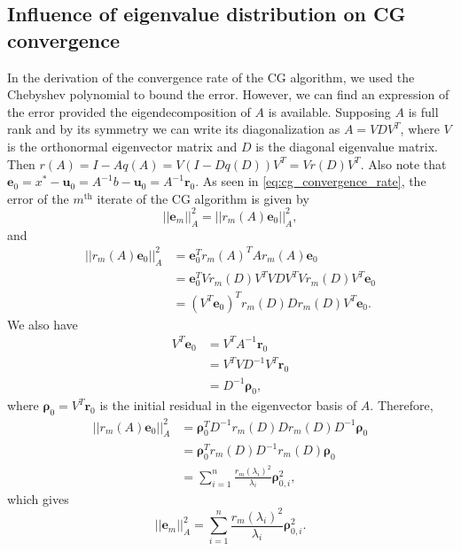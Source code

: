 \subsection{Influence of eigenvalue distribution on CG convergence}\label{sec:cg_eigenvalue_distribution}
In the derivation of the convergence rate of the CG algorithm, we used the Chebyshev polynomial to bound the error. However, we can find an expression of the error provided the eigendecomposition of $A$ is available. Supposing $A$ is full rank and by its symmetry we can write its diagonalization as $A = VDV^T$, where $V$ is the orthonormal eigenvector matrix and $D$ is the diagonal eigenvalue matrix. Then $r(A) = I - Aq(A) = V(I - Dq(D))V^T = Vr(D)V^T$. Also note that $\mathbf{e}_0 = x^* - \mathbf{u}_0 = A^{-1}b - \mathbf{u}_0 = A^{-1}\mathbf{r}_0$. As seen in \cref{eq:cg_convergence_rate}, the error of the $m^{\text{th}}$ iterate of the CG algorithm is given by
\begin{equation*}
  ||\mathbf{e}_m||_A^2 = ||r_m(A)\mathbf{e}_0||_A^2,
\end{equation*}
and
\begin{align*}
  ||r_m(A)\mathbf{e}_0||_A^2 & = \mathbf{e}_0^T r_m(A)^T A r_m(A) \mathbf{e}_0                 \\
                           & = \mathbf{e}_0^T V r_m(D) V^T V D V^T V r_m(D) V^T \mathbf{e}_0 \\
                           & = (V^T\mathbf{e}_0)^T r_m(D) D r_m(D) V^T \mathbf{e}_0.
\end{align*}
We also have
\begin{align*}
  V^T\mathbf{e}_0 & = V^T A^{-1} \mathbf{r}_0       \\
                & = V^T V D^{-1} V^T \mathbf{r}_0 \\
                & = D^{-1} \mathbf{\rho}_0,
\end{align*}
where $\mathbf{\rho}_0 = V^T \mathbf{r}_0$ is the initial residual in the eigenvector basis of $A$. Therefore,
\begin{align*}
  ||r_m(A)\mathbf{e}_0||_A^2 & = \mathbf{\rho}_0^T D^{-1} r_m(D) D r_m(D) D^{-1} \mathbf{\rho}_0                 \\
                           & = \mathbf{\rho}_0^T r_m(D) D^{-1} r_m(D)  \mathbf{\rho}_0                         \\
                           & = \sum_{i=1}^n \frac{r_m(\lambda_i)^2}{\lambda_i} \mathbf{\rho}_{0,i}^2,
\end{align*}
which gives
\begin{equation}
  ||\mathbf{e}_m||_A^2 = \sum_{i=1}^n \frac{r_m(\lambda_i)^2}{\lambda_i} \mathbf{\rho}_{0,i}^2.
  \label{eq:cg_error_eigenvalue}
\end{equation}

